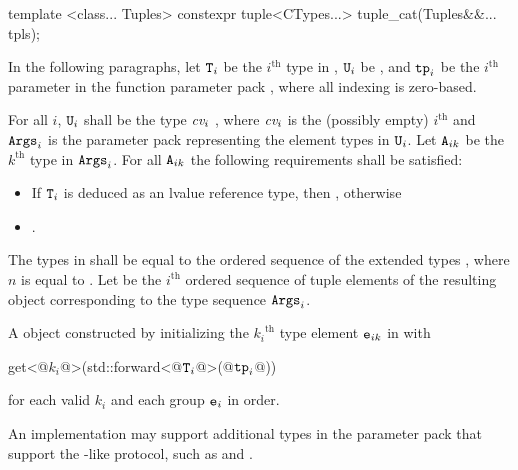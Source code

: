 \begin{itemdecl}
template <class... Tuples>
  constexpr tuple<CTypes...> tuple_cat(Tuples&&... tpls);
\end{itemdecl}

\begin{itemdescr}
\pnum
In the following paragraphs, let $\texttt{T}_i$ be the $i^\text{th}$ type in ,
$\texttt{U}_i$ be , and $\texttt{tp}_i$ be the $i^\text{th}$
parameter in the function parameter pack , where all indexing is
zero-based.

\pnum
\requires For all $i$, $\texttt{U}_i$ shall be the type
$\textit{cv}_i$ , where $\textit{cv}_i$ is the (possibly empty) $i^\text{th}$
 and $\texttt{Args}_i$ is the parameter pack representing the element
types in $\texttt{U}_i$. Let $\texttt{A}_{ik}$ be the ${k}^\text{th}$ type in $\texttt{Args}_i$. For all
$\texttt{A}_{ik}$ the following requirements shall be satisfied:
\begin{itemize}
\item If $\texttt{T}_i$ is deduced as an lvalue reference type, then
      , otherwise
\item {}.
\end{itemize}

\pnum
\remarks The types in  shall be equal to the ordered
sequence of the extended types
,
where $n$ is
equal to . Let  be the $i^\text{th}$
ordered sequence of tuple elements of the resulting  object
corresponding to the type sequence $\texttt{Args}_i$.

\pnum
\returns A  object constructed by initializing the ${k_i}^\text{th}$
type element $\texttt{e}_{ik}$ in  with
\begin{codeblock}
get<@$k_i$@>(std::forward<@$\texttt{T}_i$@>(@$\texttt{tp}_i$@))
\end{codeblock}
for each valid $k_i$ and each group $\texttt{e}_i$ in order.

\pnum
\begin{note}
An implementation may support additional types in the parameter
pack  that support the -like protocol, such as
 and .
\end{note}
\end{itemdescr}

